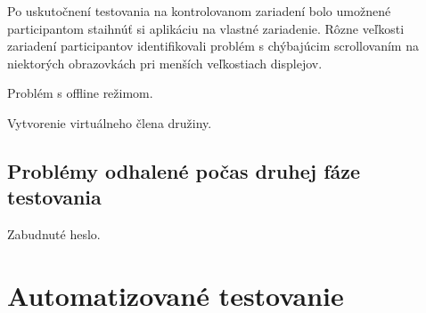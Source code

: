 Po uskutočnení testovania na kontrolovanom zariadení bolo umožnené participantom staihnúť si aplikáciu na vlastné zariadenie. Rôzne veľkosti zariadení participantov identifikovali problém s chýbajúcim scrollovaním na niektorých obrazovkách pri menších veľkostiach displejov. 

Problém s offline režimom.

Vytvorenie virtuálneho člena družiny.


\subsection{Problémy odhalené počas druhej fáze testovania}
Zabudnuté heslo.



\section{Automatizované testovanie}








